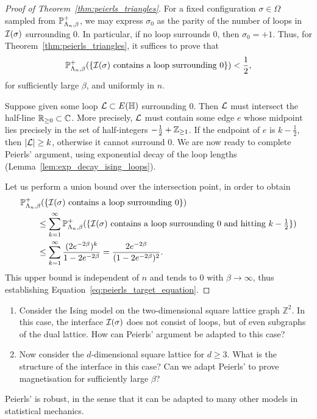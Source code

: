 \begin{proof}[Proof of Theorem~\ref{thm:peierls_triangles}]
    For a fixed configuration $\sigma\in\Omega$
    sampled from $\P_{\Lambda_n,\beta}^+$,
    we may express $\sigma_0$ as the parity of the number
    of loops in $\calI(\sigma)$ surrounding $0$.
    In particular, if no loop surrounds $0$,
    then $\sigma_0=+1$.
    Thus, for Theorem~\ref{thm:peierls_triangles},
    it suffices to prove that
    \begin{equation}
        \label{eq:peierls_target_equation}
        \P_{\Lambda_n,\beta}^+
        (\{\text{$\calI(\sigma)$ contains a loop surrounding $0$}\})
        <\frac12,
    \end{equation}
    for sufficiently large $\beta$,
    and uniformly in $n$.

    Suppose given some loop $\calL\subset E(\H)$ surrounding $0$.
    Then $\calL$ must intersect the half-line $\R_{\geq 0}\subset\C$.
    More precisely, $\calL$ must contain some edge $e$ whose midpoint
    lies precisely in the set of half-integers $-\frac12+\Z_{\geq 1}$.
    If the endpoint of $e$ is $k-\frac12$, then
    $|\calL|\geq k$, otherwise it cannot surround $0$.
    We are now ready to complete Peierls' argument,
    using exponential decay of the loop lengths (Lemma~\ref{lem:exp_decay_ising_loops}).
    
    Let us perform a union bound over the intersection point,
    in order to obtain
    \begin{align}
        &\P_{\Lambda_n,\beta}^+
        (\{\text{$\calI(\sigma)$ contains a loop surrounding $0$}\})
        \\
        &\qquad\leq
        \sum_{k=1}^\infty
        \P_{\Lambda_n,\beta}^+
        (\{\text{$\calI(\sigma)$ contains a loop surrounding $0$ and hitting $k-\tfrac12$}\})
        \\
        &\qquad\leq
        \sum_{k=1}^\infty
        \frac{(2e^{-2\beta})^k}{1-2e^{-2\beta}}
        =
        \frac{2e^{-2\beta}}{(1-2e^{-2\beta})^2}.
    \end{align}
    This upper bound is independent of $n$
    and tends to $0$ with $\beta\to\infty$,
    thus establishing Equation~\eqref{eq:peierls_target_equation}.
\end{proof}

\begin{exercise}
    \label{exo:peierls_general}
    \begin{enumerate}
        \item     Consider the Ising model on the two-dimensional square lattice graph $\mathbb{Z}^2$.
        In this case, the interface $\calI(\sigma)$ does not consist of loops, but of even subgraphs
        of the dual lattice.
        How can Peierls' argument be adapted to this case?
        \item  Now consider the $d$-dimensional square lattice for $d\geq 3$.
        What is the structure of the interface in this case?
        Can we adapt Peierls' to prove magnetisation for sufficiently large $\beta$?
    \end{enumerate}
\end{exercise}

\begin{remark}
    Peierls' is robust,
    in the sense that it can be adapted to many other models in statistical mechanics.
\end{remark}
